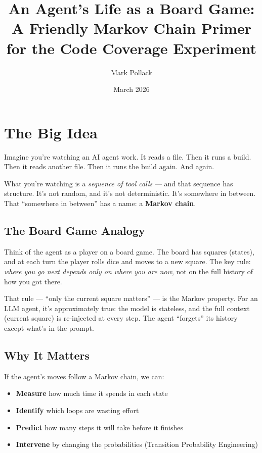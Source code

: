 \documentclass[11pt,a4paper]{article}
\title{An Agent's Life as a Board Game:\\
\large A Friendly Markov Chain Primer for the Code Coverage Experiment}
\author{Mark Pollack}
\date{March 2026}
\begin{document}
\maketitle

\tableofcontents
\newpage

\section{The Big Idea}

Imagine you're watching an AI agent work.
It reads a file. Then it runs a build. Then it reads another file.
Then it runs the build again. And again.

What you're watching is a \emph{sequence of tool calls} --- and that sequence has structure.
It's not random, and it's not deterministic. It's somewhere in between.
That ``somewhere in between'' has a name: a \textbf{Markov chain}.

\subsection*{The Board Game Analogy}

Think of the agent as a player on a board game.
The board has squares (states), and at each turn the player rolls dice and moves to a new square.
The key rule: \emph{where you go next depends only on where you are now}, not on the full history of how you got there.

That rule --- ``only the current square matters'' --- is the Markov property.
For an LLM agent, it's approximately true: the model is stateless,
and the full context (current square) is re-injected at every step.
The agent ``forgets'' its history except what's in the prompt.

\subsection*{Why It Matters}

If the agent's moves follow a Markov chain, we can:
\begin{itemize}
  \item \textbf{Measure} how much time it spends in each state
  \item \textbf{Identify} which loops are wasting effort
  \item \textbf{Predict} how many steps it will take before it finishes
  \item \textbf{Intervene} by changing the probabilities (Transition Probability Engineering)
\end{itemize}
\end{document}
